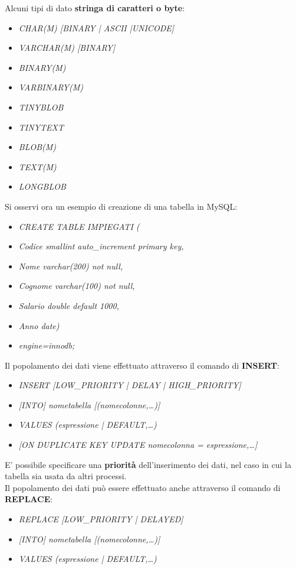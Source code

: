 \documentclass{article}
\begin{document}
Alcuni tipi di dato \textbf{stringa di caratteri o byte}:
\begin{itemize}[label={ }, leftmargin=1cm]
    \item \textit{CHAR(M) [BINARY | ASCII |UNICODE]}
    \item \textit{VARCHAR(M) [BINARY]}
    \item \textit{BINARY(M)}
    \item \textit{VARBINARY(M)}
    \item \textit{TINYBLOB}
    \item \textit{TINYTEXT}
    \item \textit{BLOB(M)}
    \item \textit{TEXT(M)}
    \item \textit{LONGBLOB}
\end{itemize}
Si osservi ora un esempio di creazione di una tabella in MySQL:
\begin{itemize}[label={ }, leftmargin=1cm]
    \item \textit{CREATE TABLE IMPIEGATI (}
    \item \textit{Codice smallint auto\_increment primary key,}
    \item \textit{Nome varchar(200) not null,}
    \item \textit{Cognome varchar(100) not null,}
    \item \textit{Salario double default 1000,}
    \item \textit{Anno date)}
    \item \textit{engine=innodb;}
\end{itemize}
Il popolamento dei dati viene effettuato attraverso il comando di \textbf{INSERT}:
\begin{itemize}[label={ }, leftmargin=1cm]
    \item \textit{INSERT [LOW\_PRIORITY | DELAY | HIGH\_PRIORITY]}
    \item \textit{[INTO] nometabella [(nomecolonne,\dots)]}
    \item \textit{VALUES ({espressione | DEFAULT},\dots)}
    \item \textit{[ON DUPLICATE KEY UPDATE nomecolonna = espressione,\dots]}
\end{itemize}
E' possibile specificare una \textbf{priorità} dell'inserimento dei dati, nel caso in cui la tabella sia usata da altri processi.\\
Il popolamento dei dati può essere effettuato anche attraverso il comando di \textbf{REPLACE}:
\begin{itemize}[label={ }, leftmargin=1cm]
    \item \textit{REPLACE [LOW\_PRIORITY | DELAYED]}
    \item \textit{[INTO] nometabella [(nomecolonne,\dots)]}
    \item \textit{VALUES ({espressione | DEFAULT},\dots)}
\end{itemize}
\end{document}
